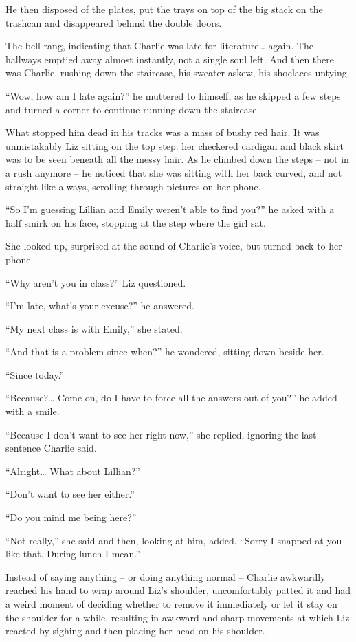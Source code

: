 He then disposed of the plates, put the trays on top of the big stack on the trashcan and disappeared behind the double doors.

\bigskip

The bell rang, indicating that Charlie was late for literature… again. The hallways emptied away almost instantly, not a single soul left. And then there was Charlie, rushing down the staircase, his sweater askew, his shoelaces untying.

“Wow, how am I late again?” he muttered to himself, as he skipped a few steps and turned a corner to continue running down the staircase.

What stopped him dead in his tracks was a mass of bushy red hair. It was unmistakably Liz sitting on the top step: her checkered cardigan and black skirt was to be seen beneath all the messy hair. As he climbed down the steps – not in a rush anymore – he noticed that she was sitting with her back curved, and not straight like always, scrolling through pictures on her phone.

“So I'm guessing Lillian and Emily weren't able to find you?” he asked with a half smirk on his face, stopping at the step where the girl sat.

She looked up, surprised at the sound of Charlie's voice, but turned back to her phone.

“Why aren't you in class?” Liz questioned.

“I'm late, what's your excuse?” he answered.

“My next class is with Emily,” she stated.

“And that is a problem since when?” he wondered, sitting down beside her.

“Since today.”

“Because?… Come on, do I have to force all the answers out of you?” he added with a smile.

“Because I don't want to see her right now,” she replied, ignoring the last sentence Charlie said.

“Alright… What about Lillian?”

“Don't want to see her either.”

“Do you mind me being here?”

“Not really,” she said and then, looking at him, added, “Sorry I snapped at you like that. During lunch I mean.”

Instead of saying anything – or doing anything normal – Charlie awkwardly reached his hand to wrap around Liz's shoulder, uncomfortably patted it and had a weird moment of deciding whether to remove it immediately or let it stay on the shoulder for a while, resulting in awkward and sharp movements at which Liz reacted by sighing and then placing her head on his shoulder.

